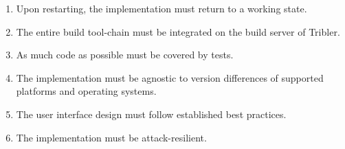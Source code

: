 \begin{enumerate}[label=B\arabic*.]
	\item Upon restarting, the implementation must return to a working state.
	\item The entire build tool-chain must be integrated on the build server of Tribler. %
	\item As much code as possible must be covered by tests.
	\item The implementation must be agnostic to version differences of supported platforms and operating systems.
	\item The user interface design must follow established best practices.%
	\item The implementation must be attack-resilient.

\end{enumerate}


